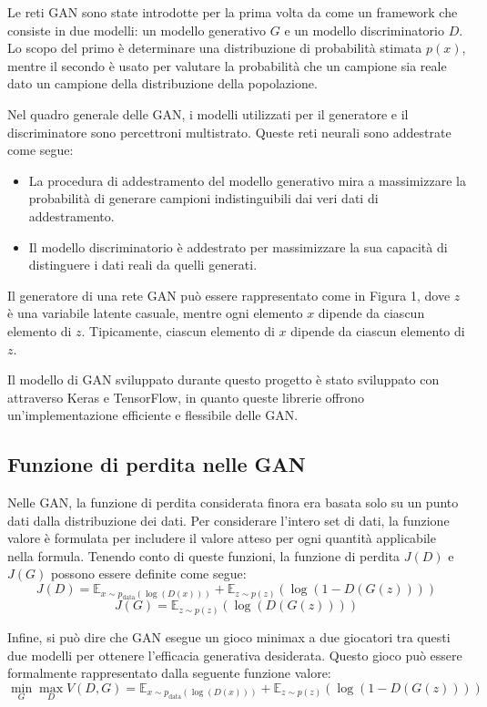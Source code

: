 Le reti GAN sono state introdotte per la prima volta da \cite{article:Goodfellow2014} come un framework che consiste in due modelli: un modello generativo \( G \) e un modello discriminatorio \( D \). Lo scopo del primo è determinare una distribuzione di probabilità stimata \( p(x) \), mentre il secondo è usato per valutare la probabilità che un campione sia reale dato un campione della distribuzione della popolazione.

Nel quadro generale delle GAN, i modelli utilizzati per il generatore e il discriminatore sono percettroni multistrato. Queste reti neurali sono addestrate come segue:
\begin{itemize}
  \item La procedura di addestramento del modello generativo mira a massimizzare la probabilità di generare campioni indistinguibili dai veri dati di addestramento.
  \item Il modello discriminatorio è addestrato per massimizzare la sua capacità di distinguere i dati reali da quelli generati.
\end{itemize}

Il generatore di una rete GAN può essere rappresentato come in Figura 1, dove \( z \) è una variabile latente casuale, mentre ogni elemento \( x \) dipende da ciascun elemento di \( z \). Tipicamente, ciascun elemento di \( x \) dipende da ciascun elemento di \( z \).

Il modello di GAN sviluppato durante questo progetto è stato sviluppato con attraverso Keras\cite{site:keras} e TensorFlow\cite{site:tensorflow}, in quanto queste librerie offrono un'implementazione efficiente e flessibile delle GAN. 

\subsection{Funzione di perdita nelle GAN}
Nelle GAN, la funzione di perdita considerata finora era basata solo su un punto dati dalla distribuzione dei dati. Per considerare l'intero set di dati, la funzione valore è formulata per includere il valore atteso per ogni quantità applicabile nella formula. Tenendo conto di queste funzioni, la funzione di perdita \( J(D) \) e \( J(G) \) possono essere definite come segue:
\[
J(D) = \mathbb{E}_{x \sim p_{\text{data}}(\log(D(x)))} + \mathbb{E}_{z \sim p(z)}(\log(1 - D(G(z))))
\]
\[
J(G) = \mathbb{E}_{z \sim p(z)}(\log(D(G(z))))
\]

Infine, si può dire che GAN esegue un gioco minimax a due giocatori tra questi due modelli per ottenere l'efficacia generativa desiderata. Questo gioco può essere formalmente rappresentato dalla seguente funzione valore:
\[
\min_{G} \max_{D} V(D, G) = \mathbb{E}_{x \sim p_{\text{data}}(\log(D(x)))} + \mathbb{E}_{z \sim p(z)}(\log(1 - D(G(z))))
\]

